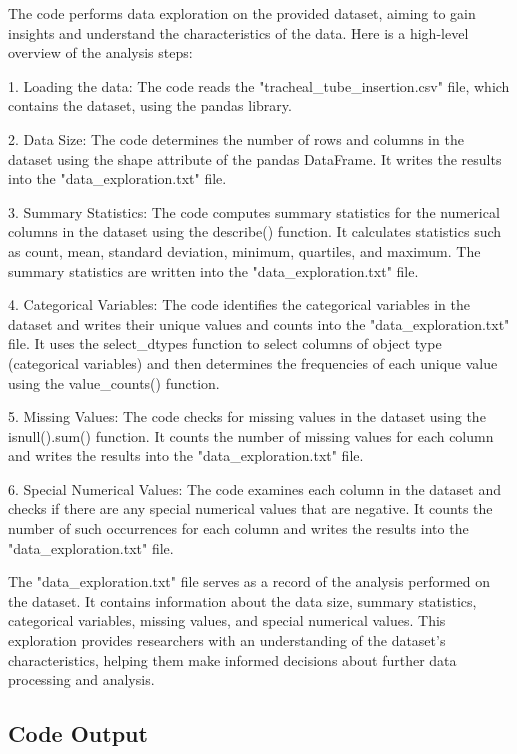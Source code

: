 \documentclass[11pt]{article}
\begin{document}
The code performs data exploration on the provided dataset, aiming to gain insights and understand the characteristics of the data. Here is a high-level overview of the analysis steps:

1. Loading the data: The code reads the "tracheal\_tube\_insertion.csv" file, which contains the dataset, using the pandas library.

2. Data Size: The code determines the number of rows and columns in the dataset using the shape attribute of the pandas DataFrame. It writes the results into the "data\_exploration.txt" file.

3. Summary Statistics: The code computes summary statistics for the numerical columns in the dataset using the describe() function. It calculates statistics such as count, mean, standard deviation, minimum, quartiles, and maximum. The summary statistics are written into the "data\_exploration.txt" file.

4. Categorical Variables: The code identifies the categorical variables in the dataset and writes their unique values and counts into the "data\_exploration.txt" file. It uses the select\_dtypes function to select columns of object type (categorical variables) and then determines the frequencies of each unique value using the value\_counts() function.

5. Missing Values: The code checks for missing values in the dataset using the isnull().sum() function. It counts the number of missing values for each column and writes the results into the "data\_exploration.txt" file.

6. Special Numerical Values: The code examines each column in the dataset and checks if there are any special numerical values that are negative. It counts the number of such occurrences for each column and writes the results into the "data\_exploration.txt" file.

The "data\_exploration.txt" file serves as a record of the analysis performed on the dataset. It contains information about the data size, summary statistics, categorical variables, missing values, and special numerical values. This exploration provides researchers with an understanding of the dataset's characteristics, helping them make informed decisions about further data processing and analysis.

\subsection{Code Output}
\end{document}
